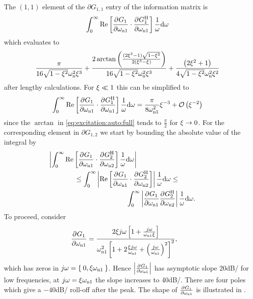 The $(1,1)$ element of the $\partial G_{1,1}$ entry of the information matrix is
\begin{align}
  \int_0^\infty
    \real{
         \PartialDerivative{G_1}{\wn[1]}
         \cdot
         \PartialDerivative{G_1^{\HT}}{\wn[1]}
    }
      \frac{1}{\omega}
      \dd\omega
\end{align}
which evaluates to
\begin{equation}
\frac{\pi }
          {16  \sqrt{1 - \damping^2}\wn^{2} \damping^{3}} 
+ 
\frac{ 2\arctan  
                               \left(
                                       \frac{(2  \damping^{2} - 1) \sqrt{1-\damping^{2}}}
                                                {2  (\damping^{3} - \damping)}
                              \right)}
         {16  \sqrt{1-\damping^{2}} \wn^{2}  \damping^{3}}
+
\frac{{\left(2  \damping^{2} + 1 \right)} }
         {4  \sqrt{1-\damping^{2}} \wn^{2} \damping^{2}}
\label{eq:excitation:auto:full}
\end{equation}
after lengthy calculations.
For $\damping \ll 1$ this can be simplified to
\begin{equation}
\label{eq:excitation:auto}
\int_0^\infty
\real{
   \PartialDerivative{G_1}{\wn[1]}
   \cdot
   \PartialDerivative{G_1^{\HT}}{\wn[1]}
   }
\frac{1}{\omega}
\dd\omega
 = 
 \frac{\pi}
          {8\wn[1]^2}\damping^{-3} 
+ \bigO{\damping^{-2}}
\end{equation}
since the $\arctan$ in \eqref{eq:excitation:auto:full} tends to $\frac{\pi}{2}$ for $\damping \to 0$.
For the corresponding element in $\partial G_{1,2}$ we start by bounding the absolute value of the integral by
\begin{gather}
\abs{
    \int_0^\infty
    \real{
       \PartialDerivative{G_1}{\wn[1]}
       \cdot
       \PartialDerivative{G_2^{\HT}}{\wn[2]}
    }
    \frac{1}{\omega}
    \dd\omega
}
\qquad \qquad \qquad \qquad \qquad
\label{eq:excitation:cross1} \\
\leq
\int_0^\infty
\abs{
  \real{
    \PartialDerivative{G_1}{\wn[1]}
    \cdot
    \PartialDerivative{G_2^{\HT}}{\wn[2]}
  }
}
\frac{1}{\omega}
\dd\omega
\leq \\
\qquad \qquad \qquad \qquad \qquad
\int_0^\infty
\abs{
  \PartialDerivative{G_1}{\wn[1]}\PartialDerivative{G_2^{\HT}}{\wn[2]}
}
\frac{1}{\omega}
\dd\omega
\label{eq:excitation:cross}
\text{.}
\end{gather}
To proceed, consider
\begin{align}
\PartialDerivative{G_1}{\wn[1]} 
  &= 
     \frac{2\damping j\omega\left[1+\frac{j\omega}{\wn[1]\damping}\right]}
               {\wn[1]^2\left[1+2\frac{\damping j\omega}{\wn[1]} + \left(\frac{j\omega}{\wn[1]}\right)^2\right]^2},
\end{align}
which has zeros in $j\omega=\Set{0, \damping\wn[1]}$. 
Hence $\abs{\PartialDerivative{G_1}{\wn[1]} }$ has asymptotic slope 20\unit{dB/\decade} for low frequencies, at $j\omega=\damping\wn[1]$ the slope increases to 40\unit{dB/\decade}. 
There are four poles which give a $-40$\unit{dB/\decade} roll-off after the peak. 
The shape of $\PartialDerivative{G_1}{\wn[1]} $ is illustrated in .

